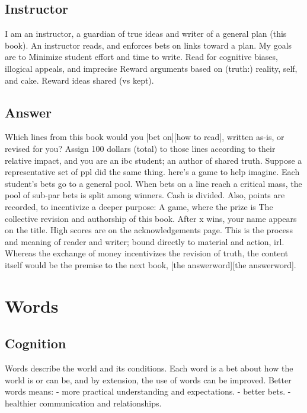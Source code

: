 \documentclass[
]{book}
\begin{document}
\section{Instructor}\label{instructor}

I am an instructor, a guardian of true ideas and writer of a general plan (this book).
An instructor reads, and enforces bets on links toward a plan.
My goals are to
Minimize student effort and time to write.
Read for cognitive biases, illogical appeals, and imprecise
Reward arguments based on (truth:) reality, self, and cake.
Reward ideas shared (vs kept).

\section{Answer}\label{answer}

Which lines from this book would you {[}bet on{]}{[}how to read{]}, written as-is, or revised for you?
Assign 100 dollars (total) to those lines according to their relative impact, and you are an ibc student; an author of shared truth.
Suppose a representative set of ppl did the same thing. here's a game to help imagine.
Each student's bets go to a general pool.
When bets on a line reach a critical mass, the pool of sub-par bets is split among winners.
Cash is divided.
Also, points are recorded, to incentivize a deeper purpose:
A game, where the prize is
The collective revision and authorship of this book.
After x wins, your name appears on the title.
High scores are on the acknowledgements page.
This is the process and meaning of reader and writer; bound directly to material and action, irl.
Whereas the exchange of money incentivizes the revision of truth, the content itself would be the premise to the next book, {[}the answerword{]}{[}the answerword{]}.

\chapter{Words}\label{words}

\section{Cognition}\label{cognition}

Words describe the world and its conditions.
Each word is a bet about how the world is or can be,
and by extension, the use of words can be improved.
Better words means:
- more practical understanding and expectations.
- better bets.
- healthier communication and relationships.
\end{document}
